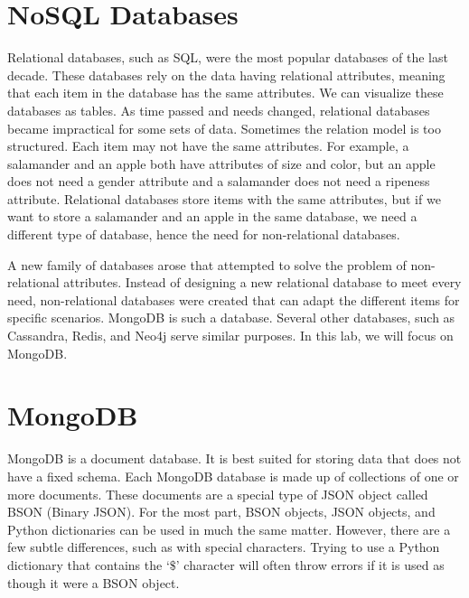 \label{lab:mongodb}

\section*{NoSQL Databases}
Relational databases, such as SQL, were the most popular databases of the last decade.  These databases rely on the data having relational attributes, meaning that each item in the database has the same attributes.  We can visualize these databases as tables.  As time passed and needs changed, relational databases became impractical for some sets of data.  Sometimes the relation model is too structured.  Each item may not have the same attributes.  For example, a salamander and an apple both have attributes of size and color, but an apple does not need a gender attribute and a salamander does not need a ripeness attribute.  Relational databases store items with the same attributes, but if we want to store a salamander and an apple in the same database, we need a different type of database, hence the need for non-relational databases.

A new family of databases arose that attempted to solve the problem of non-relational attributes.  Instead of designing a new relational database to meet every need, non-relational databases were created that can adapt the different items for specific scenarios.  MongoDB is such a database.  Several other databases, such as Cassandra, Redis, and Neo4j serve similar purposes.  In this lab, we will focus on MongoDB.

\section*{MongoDB}
MongoDB is a document database.  It is best suited for storing data that does not have a fixed schema.  Each MongoDB database is made up of collections of one or more documents.  These documents are a special type of JSON object called BSON (Binary JSON).  For the most part, BSON objects, JSON objects, and Python dictionaries can be used in much the same matter.  However, there are a few subtle differences, such as with special characters.  Trying to use a Python dictionary that contains the `$\$$' character will often throw errors if it is used as though it were a BSON object.

